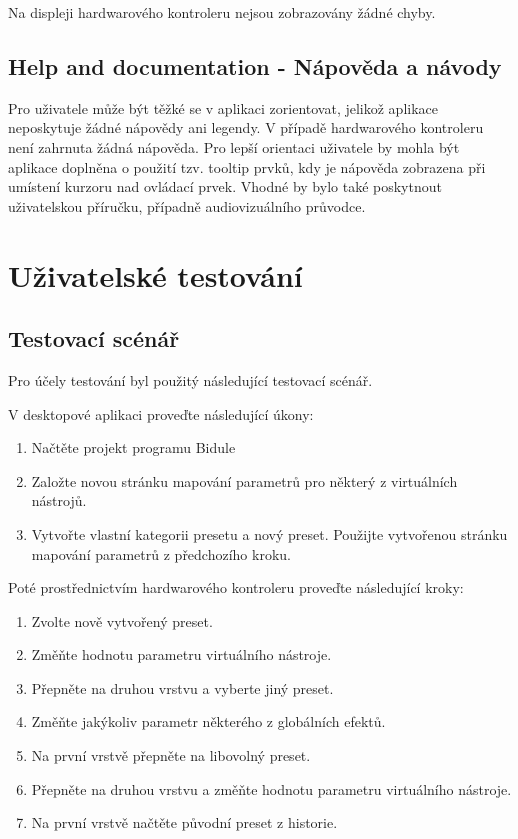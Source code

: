 \documentclass[thesis=M,czech]{FITthesis}[2019/03/06]
\begin{document}
			Na displeji hardwarového kontroleru nejsou zobrazovány žádné chyby.

		\subsection{Help and documentation - Nápověda a návody}
			Pro uživatele může být těžké se v aplikaci zorientovat, jelikož aplikace neposkytuje žádné nápovědy ani legendy. V případě hardwarového kontroleru není zahrnuta žádná nápověda. 
			Pro lepší orientaci uživatele by mohla být aplikace doplněna o použití tzv. tooltip prvků, kdy je nápověda zobrazena při umístení kurzoru nad ovládací prvek.
			Vhodné by bylo také poskytnout uživatelskou příručku, případně audiovizuálního průvodce.
		
	\section{Uživatelské testování}
		\subsection{Testovací scénář}
			Pro účely testování byl použitý následující testovací scénář.
			
			V desktopové aplikaci proveďte následující úkony:
			\begin{enumerate}
				\item Načtěte projekt programu Bidule
				\item Založte novou stránku mapování parametrů pro některý z virtuálních nástrojů.
				\item Vytvořte vlastní kategorii presetu a nový preset. Použijte vytvořenou stránku mapování parametrů z předchozího kroku.
			\end{enumerate}
				
			Poté prostřednictvím hardwarového kontroleru proveďte následující kroky:
			\begin{enumerate}
				\item Zvolte nově vytvořený preset.
				\item Změňte hodnotu parametru virtuálního nástroje.
				\item Přepněte na druhou vrstvu a vyberte jiný preset.
				\item Změňte jakýkoliv parametr některého z globálních efektů.
				\item Na první vrstvě přepněte na libovolný preset.
				\item Přepněte na druhou vrstvu a změňte hodnotu parametru virtuálního nástroje.
				\item Na první vrstvě načtěte původní preset z historie.
			\end{enumerate}
		
\end{document}
